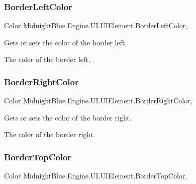 \subsubsection{\texorpdfstring{Border\+Left\+Color}{BorderLeftColor}}
{\footnotesize\ttfamily Color Midnight\+Blue.\+Engine.\+U\+I.\+U\+I\+Element.\+Border\+Left\+Color\hspace{0.3cm}{\ttfamily [get]}, {\ttfamily [set]}}



Gets or sets the color of the border left. 

The color of the border left.\hypertarget{class_midnight_blue_1_1_engine_1_1_u_i_1_1_u_i_element_a49304800447f5a482ec55bd338187791}{}\label{class_midnight_blue_1_1_engine_1_1_u_i_1_1_u_i_element_a49304800447f5a482ec55bd338187791} 
\subsubsection{\texorpdfstring{Border\+Right\+Color}{BorderRightColor}}
{\footnotesize\ttfamily Color Midnight\+Blue.\+Engine.\+U\+I.\+U\+I\+Element.\+Border\+Right\+Color\hspace{0.3cm}{\ttfamily [get]}, {\ttfamily [set]}}



Gets or sets the color of the border right. 

The color of the border right.\hypertarget{class_midnight_blue_1_1_engine_1_1_u_i_1_1_u_i_element_a6eb674d26e9970557dc5d55f41ad3010}{}\label{class_midnight_blue_1_1_engine_1_1_u_i_1_1_u_i_element_a6eb674d26e9970557dc5d55f41ad3010} 
\subsubsection{\texorpdfstring{Border\+Top\+Color}{BorderTopColor}}
{\footnotesize\ttfamily Color Midnight\+Blue.\+Engine.\+U\+I.\+U\+I\+Element.\+Border\+Top\+Color\hspace{0.3cm}{\ttfamily [get]}, {\ttfamily [set]}}



